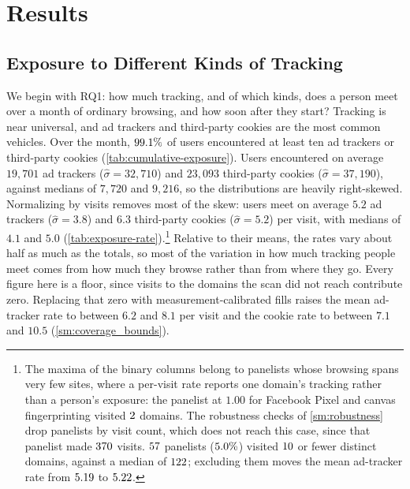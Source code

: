 \documentclass[12pt, letterpaper]{article}
\begin{document}
\section{Results}
\label{sec:results}
 
\subsection{Exposure to Different Kinds of Tracking}
\label{sec:prevalence_tracking}




We begin with RQ1: how much tracking, and of which kinds, does a person meet over a month of ordinary browsing, and how soon after they start? Tracking is near universal, and ad trackers and third-party cookies are the most common vehicles. Over the month, $99.1\%$ of users encountered at least ten ad trackers or third-party cookies (\cref{tab:cumulative-exposure}). Users encountered on average $19{,}701$ ad trackers ($\hat{\sigma} = 32{,}710$) and $23{,}093$ third-party cookies ($\hat{\sigma} = 37{,}190$), against medians of $7{,}720$ and $9{,}216$, so the distributions are heavily right-skewed. Normalizing by visits removes most of the skew: users meet on average $5.2$ ad trackers ($\hat{\sigma} = 3.8$) and $6.3$ third-party cookies ($\hat{\sigma} = 5.2$) per visit, with medians of $4.1$ and $5.0$ (\cref{tab:exposure-rate}).\footnote{The maxima of the binary columns belong to panelists whose browsing spans very few sites, where a per-visit rate reports one domain's tracking rather than a person's exposure: the panelist at $1.00$ for Facebook Pixel and canvas fingerprinting visited $2$ domains. The robustness checks of \cref{sm:robustness} drop panelists by visit count, which does not reach this case, since that panelist made $370$ visits. $57$ panelists ($5.0\%$) visited $10$ or fewer distinct domains, against a median of $122$; excluding them moves the mean ad-tracker rate from $5.19$ to $5.22$.} Relative to their means, the rates vary about half as much as the totals, so most of the variation in how much tracking people meet comes from how much they browse rather than from where they go. Every figure here is a floor, since visits to the domains the scan did not reach contribute zero.
Replacing that zero with measurement-calibrated fills raises the mean ad-tracker rate to between $6.2$ and $8.1$ per visit and the cookie rate to between $7.1$ and $10.5$ (\cref{sm:coverage_bounds}).
\end{document}
